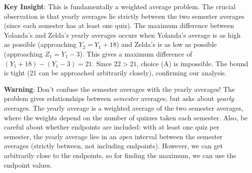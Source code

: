 \documentclass[12pt]{article}
\begin{document}
\begin{keyinsightbox}
\textbf{Key Insight}: This is fundamentally a weighted average problem. The crucial observation is that yearly averages lie strictly between the two semester averages (since each semester has at least one quiz). The maximum difference between Yolanda's and Zelda's yearly averages occurs when Yolanda's average is as high as possible (approaching $Y_2 = Y_1 + 18$) and Zelda's is as low as possible (approaching $Z_1 = Y_1 - 3$). This gives a maximum difference of $(Y_1 + 18) - (Y_1 - 3) = 21$. Since $22 > 21$, choice (A) is impossible. The bound is tight (21 can be approached arbitrarily closely), confirming our analysis.
\end{keyinsightbox}

\begin{warningbox}
\textbf{Warning}: Don't confuse the semester averages with the yearly averages! The problem gives relationships between \textit{semester} averages, but asks about \textit{yearly} averages. The yearly average is a weighted average of the two semester averages, where the weights depend on the number of quizzes taken each semester. Also, be careful about whether endpoints are included: with at least one quiz per semester, the yearly average lies in an \textit{open} interval between the semester averages (strictly between, not including endpoints). However, we can get arbitrarily close to the endpoints, so for finding the maximum, we can use the endpoint values.
\end{warningbox}
\end{document}
